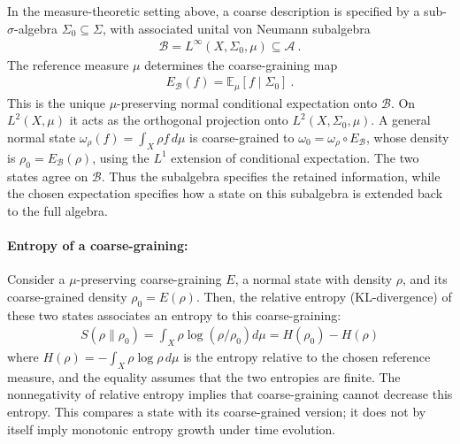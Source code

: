 \documentclass[a4paper,11pt]{article}
\theoremstyle{definition}
\newcommand{\mA}{\mathcal{A}}
\newcommand{\mB}{\mathcal{B}}
\begin{document}
In the measure-theoretic setting above, a coarse description is specified by a sub-$\sigma$-algebra $\Sigma_0\subseteq\Sigma$, with associated unital von Neumann subalgebra
\begin{align}
    \mB=L^\infty(X,\Sigma_0,\mu)\subseteq\mA\ .
\end{align}
The reference measure $\mu$ determines the coarse-graining map
\begin{align}
    E_{\mB}(f)=\mathbb E_\mu[f\mid\Sigma_0]\ .
\end{align}
This is the unique $\mu$-preserving normal conditional expectation onto $\mB$. On $L^2(X,\mu)$ it acts as the orthogonal projection onto $L^2(X,\Sigma_0,\mu)$. A general normal state $\omega_\rho(f)=\int_X\rho f\,d\mu$ is coarse-grained to $\omega_0=\omega_\rho\circ E_{\mB}$, whose density is $\rho_0=E_{\mB}(\rho)$, using the $L^1$ extension of conditional expectation. The two states agree on $\mB$. Thus the subalgebra specifies the retained information, while the chosen expectation specifies how a state on this subalgebra is extended back to the full algebra.


\paragraph{Entropy of a coarse-graining:} Consider a $\mu$-preserving coarse-graining $E$, a normal state with density $\rho$, and its coarse-grained density $\rho_0=E(\rho)$. Then, the relative entropy (KL-divergence) of these two states associates an entropy to this coarse-graining:
\begin{align}
    \label{eq:KL-classical}
    S(\rho\|\rho_0)=\int_X \rho \log(\rho/\rho_0)d\mu=H(\rho_0)-H(\rho)
\end{align}
where $H(\rho)=-\int_X\rho\log\rho\,d\mu$ is the entropy relative to the chosen reference measure, and the equality assumes that the two entropies are finite. The nonnegativity of relative entropy implies that coarse-graining cannot decrease this entropy. This compares a state with its coarse-grained version; it does not by itself imply monotonic entropy growth under time evolution.
\end{document}

